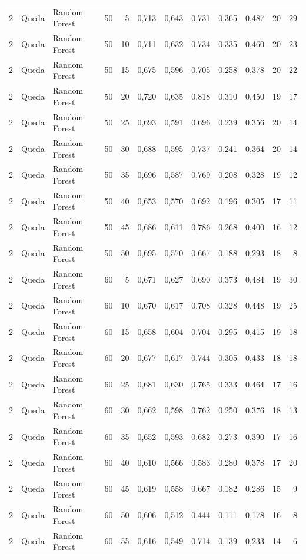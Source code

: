 \begin{longtable}{@{}rllrrrrrrrrr@{}}
2 & Queda & Random Forest & 50 & 5 & 0,713 & 0,643 & 0,731 & 0,365 & 0,487 & 20 & 29 \\
2 & Queda & Random Forest & 50 & 10 & 0,711 & 0,632 & 0,734 & 0,335 & 0,460 & 20 & 23 \\
2 & Queda & Random Forest & 50 & 15 & 0,675 & 0,596 & 0,705 & 0,258 & 0,378 & 20 & 22 \\
2 & Queda & Random Forest & 50 & 20 & 0,720 & 0,635 & 0,818 & 0,310 & 0,450 & 19 & 17 \\
2 & Queda & Random Forest & 50 & 25 & 0,693 & 0,591 & 0,696 & 0,239 & 0,356 & 20 & 14 \\
2 & Queda & Random Forest & 50 & 30 & 0,688 & 0,595 & 0,737 & 0,241 & 0,364 & 20 & 14 \\
2 & Queda & Random Forest & 50 & 35 & 0,696 & 0,587 & 0,769 & 0,208 & 0,328 & 19 & 12 \\
2 & Queda & Random Forest & 50 & 40 & 0,653 & 0,570 & 0,692 & 0,196 & 0,305 & 17 & 11 \\
2 & Queda & Random Forest & 50 & 45 & 0,686 & 0,611 & 0,786 & 0,268 & 0,400 & 16 & 12 \\
2 & Queda & Random Forest & 50 & 50 & 0,695 & 0,570 & 0,667 & 0,188 & 0,293 & 18 & 8 \\
2 & Queda & Random Forest & 60 & 5 & 0,671 & 0,627 & 0,690 & 0,373 & 0,484 & 19 & 30 \\
2 & Queda & Random Forest & 60 & 10 & 0,670 & 0,617 & 0,708 & 0,328 & 0,448 & 19 & 25 \\
2 & Queda & Random Forest & 60 & 15 & 0,658 & 0,604 & 0,704 & 0,295 & 0,415 & 19 & 18 \\
2 & Queda & Random Forest & 60 & 20 & 0,677 & 0,617 & 0,744 & 0,305 & 0,433 & 18 & 18 \\
2 & Queda & Random Forest & 60 & 25 & 0,681 & 0,630 & 0,765 & 0,333 & 0,464 & 17 & 16 \\
2 & Queda & Random Forest & 60 & 30 & 0,662 & 0,598 & 0,762 & 0,250 & 0,376 & 18 & 13 \\
2 & Queda & Random Forest & 60 & 35 & 0,652 & 0,593 & 0,682 & 0,273 & 0,390 & 17 & 16 \\
2 & Queda & Random Forest & 60 & 40 & 0,610 & 0,566 & 0,583 & 0,280 & 0,378 & 17 & 20 \\
2 & Queda & Random Forest & 60 & 45 & 0,619 & 0,558 & 0,667 & 0,182 & 0,286 & 15 & 9 \\
2 & Queda & Random Forest & 60 & 50 & 0,606 & 0,512 & 0,444 & 0,111 & 0,178 & 16 & 8 \\
2 & Queda & Random Forest & 60 & 55 & 0,616 & 0,549 & 0,714 & 0,139 & 0,233 & 14 & 6 \\

\end{longtable}
